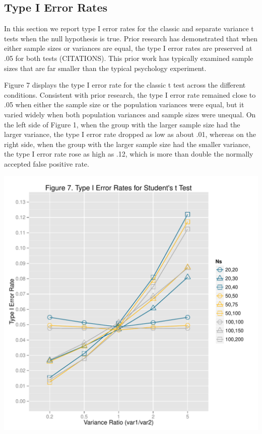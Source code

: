\documentclass[man,a4paper,noextraspace]{apa6}\usepackage[]{graphicx}\usepackage[]{color}
\makeatletter
\def\maxwidth{ %
  \ifdim\Gin@nat@width>\linewidth
    \linewidth
  \else
    \Gin@nat@width
  \fi
}
\newenvironment{knitrout}{}{} %
\makeatother
\begin{document}
\subsection{Type I Error Rates}


    In this section we report type I error rates for the classic and separate variance t tests when the null hypothesis is true. Prior research has demonstrated that when either sample sizes or variances are equal, the type I error rates are preserved at .05 for both tests (CITATIONS). This prior work has typically examined sample sizes that are far smaller than the typical psychology experiment.
    
    Figure 7 displays the type I error rate for the classic t test across the different conditions. Consistent with prior research, the type I error rate remained close to .05 when either the sample size or the population variances were equal, but it varied widely when both population variances and sample sizes were unequal. On the left side of Figure 1, when the group with the larger sample size had the larger variance, the type I error rate dropped as low as about .01, whereas on the right side, when the group with the larger sample size had the smaller variance, the type I error rate rose as high as .12, which is more than double the normally accepted false positive rate. 
    
\begin{knitrout}
\color{fgcolor}
\includegraphics[width=\maxwidth]{figure/type1_classic_plot} 

\end{knitrout}
\end{document}
